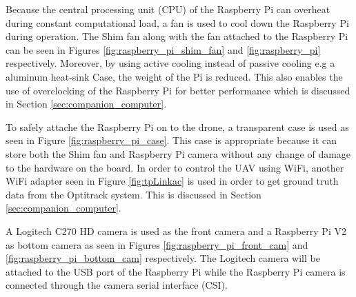 \documentclass[../Head/report.tex]{subfiles}
\begin{document}
Because the central processing unit (CPU) of the Raspberry Pi can overheat during constant computational load, a fan is used to cool down the Raspberry Pi during operation. The Shim fan along with the fan attached to the Raspberry Pi can be seen in Figures \ref{fig:raspberry_pi_shim_fan} and \ref{fig:raspberry_pi} respectively. Moreover, by using active cooling instead of passive cooling e.g a aluminum heat-sink Case, the weight of the Pi is reduced. This also enables the use of overclocking of the Raspberry Pi for better performance which is discussed in Section \ref{sec:companion_computer}.

To safely attache the Raspberry Pi on to the drone, a transparent case is used as seen in Figure \ref{fig:raspberry_pi_case}. This case is appropriate because it can store both the Shim fan and Raspberry Pi camera without any change of damage to the hardware on the board. In order to control the UAV using WiFi, another WiFi adapter seen in Figure \ref{fig:tpLinkac} is used in order to get ground truth data from the Optitrack system. This is discussed in Section \ref{sec:companion_computer}.

A Logitech C270 HD camera is used as the front camera and a Raspberry Pi V2 as bottom camera as seen in Figures \ref{fig:raspberry_pi_front_cam} and \ref{fig:raspberry_pi_bottom_cam} respectively. The Logitech camera will be attached to the USB port of the Raspberry Pi while the Raspberry Pi camera is connected through the camera serial interface (CSI). 
\end{document}
